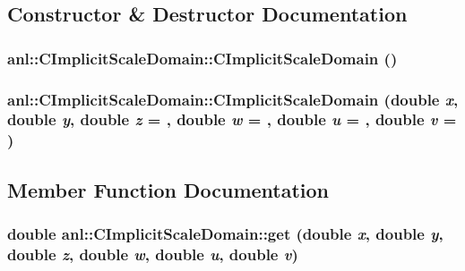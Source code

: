 \subsection{Constructor \& Destructor Documentation}
\hypertarget{classanl_1_1CImplicitScaleDomain_a1d894bf64f44a3b592c0dc9475b6016f}{
\subsubsection[{CImplicitScaleDomain}]{\setlength{\rightskip}{0pt plus 5cm}anl::CImplicitScaleDomain::CImplicitScaleDomain ()}}
\label{classanl_1_1CImplicitScaleDomain_a1d894bf64f44a3b592c0dc9475b6016f}
\hypertarget{classanl_1_1CImplicitScaleDomain_a9afc4b458c789129e223ec177d7b192f}{
\subsubsection[{CImplicitScaleDomain}]{\setlength{\rightskip}{0pt plus 5cm}anl::CImplicitScaleDomain::CImplicitScaleDomain (double {\em x}, \/  double {\em y}, \/  double {\em z} = {}, \/  double {\em w} = {}, \/  double {\em u} = {}, \/  double {\em v} = {})}}
\label{classanl_1_1CImplicitScaleDomain_a9afc4b458c789129e223ec177d7b192f}


\subsection{Member Function Documentation}
\hypertarget{classanl_1_1CImplicitScaleDomain_aed69393e0a156ec2c0bf385b3e9345e7}{
\subsubsection[{get}]{\setlength{\rightskip}{0pt plus 5cm}double anl::CImplicitScaleDomain::get (double {\em x}, \/  double {\em y}, \/  double {\em z}, \/  double {\em w}, \/  double {\em u}, \/  double {\em v})}}
\label{classanl_1_1CImplicitScaleDomain_aed69393e0a156ec2c0bf385b3e9345e7}


